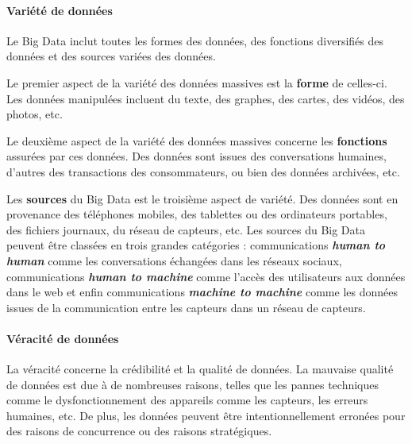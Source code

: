 		
		
		
		
		\paragraph{Variété de données} \label{variete-data}
		
		Le Big Data inclut toutes les formes des données, des fonctions diversifiés des données et des sources variées des données.
		
		Le premier aspect de la variété  des données massives est la \textbf{forme} de celles-ci. Les données manipulées incluent du texte, des graphes, des cartes, des vidéos, des photos, etc.
		
		Le deuxième aspect de la variété des données massives concerne les \textbf{fonctions} assurées par ces données. Des données sont issues des conversations humaines, d'autres des transactions des consommateurs, ou bien des données archivées, etc.
		
		Les \textbf{sources} du Big Data est le troisième aspect de  variété. Des données sont en provenance des téléphones mobiles, des tablettes ou des ordinateurs portables, des fichiers journaux, du réseau de capteurs, etc. Les sources du Big Data peuvent être classées en trois grandes catégories : communications \textbf{\textit{human to human}} comme les conversations échangées dans les réseaux sociaux, communications \textbf{\textit{ human to machine}} comme l'accès des utilisateurs aux données dans le web et enfin communications \textbf{\textit{machine to machine}} comme les données issues de la communication entre les capteurs dans un réseau de capteurs.
		
		
		
		\paragraph{Véracité de données}
		
		La véracité concerne la crédibilité et la qualité de données. La mauvaise qualité de données est due à de nombreuses raisons, telles que les pannes techniques comme le dysfonctionnement des appareils comme les capteurs, les erreurs humaines,  etc. De plus, les données peuvent être intentionnellement erronées pour des raisons de concurrence ou des raisons stratégiques.
	
